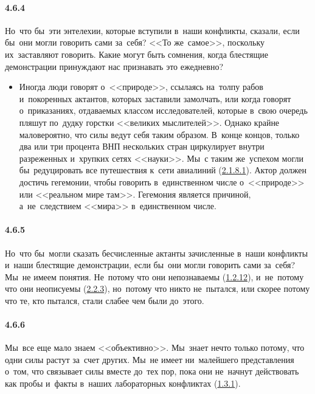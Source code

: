 \paragraph{4.6.4}\hypertarget{par:4.6.4}{} Но~что бы~эти энтелехии, которые вступили в~наши конфликты, сказали, если бы~они могли говорить {сами за~себя}? <<То же~самое>>, поскольку их~заставляют говорить. Какие могут быть сомнения, когда блестящие демонстрации принуждают нас признавать это ежедневно? 
	\begin{itemize}
	\item 
	Иногда люди говорят о~<<природе>>, ссылаясь на~толпу рабов и~покоренных актантов, которых заставили замолчать, или когда говорят о~приказаниях, отдаваемых классом исследователей, которые в~свою очередь пляшут по~дудку горстки <<великих мыслителей>>. Однако крайне маловероятно, что силы ведут себя таким образом. В~конце концов, только два или три процента ВНП нескольких стран циркулирует внутри разреженных и~хрупких сетях <<науки>>. Мы~с таким же~успехом могли бы~редуцировать все путешествия к~сети авиалиний (\hyperlink{par:2.1.8.1}{2.1.8.1}). Актор должен достичь гегемонии, чтобы говорить в~единственном числе о~<<природе>> или <<реальном мире там>>. Гегемония является причиной, а~не~следствием <<мира>> в~единственном числе.
	\end{itemize}

\paragraph{4.6.5}\hypertarget{par:4.6.5}{} Но~что бы~могли сказать бесчисленные актанты зачисленные в~наши конфликты и~наши блестящие демонстрации, если бы~они могли говорить сами за~себя? Мы~не имеем понятия. Не~потому что они непознаваемы (\hyperlink{par:1.2.12}{1.2.12}), и~не~потому что они неописуемы (\hyperlink{par:2.2.3}{2.2.3}), но~потому что никто не~пытался, или скорее потому что те, кто пытался, стали слабее чем были до~этого.


\paragraph{4.6.6}\hypertarget{par:4.6.6}{} Мы~все еще мало знаем <<объективно>>. Мы~знает нечто только потому, что одни силы растут за~счет других. Мы~не имеет ни~малейшего представления о~том, что связывает силы вместе до~тех пор, пока они не~начнут действовать как пробы и~факты в~наших лабораторных конфликтах (\hyperlink{par:1.3.1}{1.3.1}).


